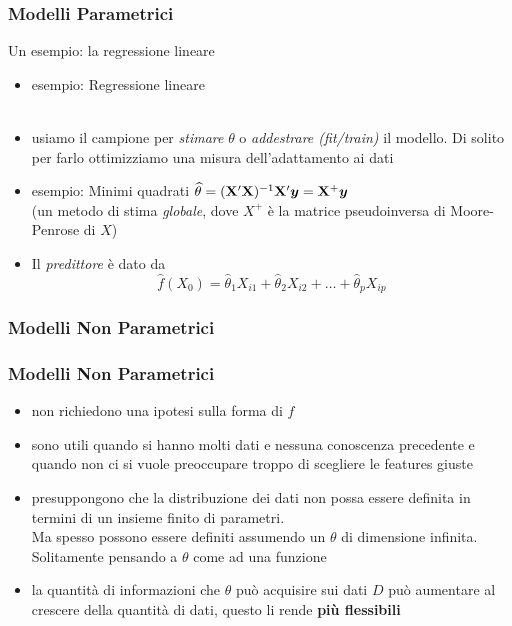 {\begin{frame}
\end{frame}





\begin{frame}
	\frametitle{Modelli Parametrici}

	\begin{block}{Un esempio: la regressione lineare}
		\begin{itemize}
		\item esempio: Regressione lineare\\
	  			\\
			\vspace{2mm}
			\item usiamo il campione per \emph{stimare} $\theta$ o \emph{addestrare (fit/train)} il modello. Di solito per farlo ottimizziamo una misura dell'adattamento ai dati
			\item esempio: Minimi quadrati $\widehat\theta = (\mathbf{X}^\prime \mathbf{X})^{-1} \mathbf{X}' \mbox{\boldmath$y$} = \mathbf{X}^{+}\mbox{\boldmath$y$}$\\
			(un metodo di stima \emph{globale}, dove $X^{+}$ è la matrice pseudoinversa di Moore-Penrose di $X$)
		\item Il \emph{predittore} è dato da
			$$\widehat{f}(X_0) = \widehat{\theta}_1 X_{i1} + \widehat{\theta}_2 X_{i2} + \ldots + \widehat{\theta}_p X_{ip}$$
		\end{itemize}
	\end{block}
\end{frame}


\subsubsection[Modelli Non Parametrici]{Modelli Non Parametrici}

\begin{frame}

	\frametitle{Modelli Non Parametrici}

		\begin{itemize}
			\item non richiedono una ipotesi sulla forma di $f$
			\item sono utili quando si hanno molti dati e nessuna conoscenza precedente e quando non ci si vuole preoccupare troppo di scegliere le features giuste
			\item presuppongono che la distribuzione dei dati non possa essere definita in termini di un insieme finito di parametri.\\
				Ma spesso possono essere definiti assumendo un $\theta$ di dimensione infinita. Solitamente pensando a $\theta$ come ad una funzione
			\item la quantità di informazioni che $\theta$ può acquisire sui dati $D$ può aumentare al crescere della quantità di dati, questo li rende \textbf{più flessibili}
		\end{itemize}


\end{frame}}
